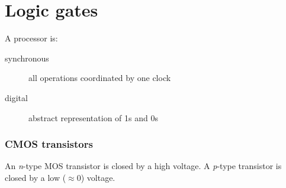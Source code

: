 \chapter{Logic gates}
A processor is:
\begin{description}
	\item[synchronous] all operations coordinated by one clock
	\item[digital] abstract representation of 1s and 0s
\end{description}

\subsection{CMOS transistors}
An \emph{n}-type MOS transistor is closed by a high voltage. A \emph{p}-type transistor is closed by a low (\(\approx 0\)) voltage.